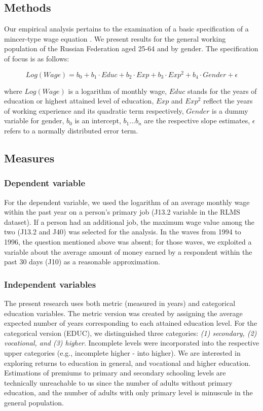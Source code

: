 \documentclass[12pt,a4paper]{article}
\numberwithin{equation}{section}
\begin{document}
\subsection*{Methods}

Our empirical analysis pertains to the examination of a basic specification of a mincer-type wage equation \parencite{mincer_082._1974}. We present results for the general working population of the Russian Federation aged 25-64 and by gender. The specification of focus is as follows:

$$Log(Wage) = b_0 + b_1\cdot Educ + b_2\cdot Exp + b_3\cdot Exp^2 + b_4\cdot Gender + \epsilon$$

\noindent
where $Log(Wage)$ is a logarithm of monthly wage, $Educ$ stands for the years of education or highest attained level of education, $Exp$ and $Exp^2$ reflect the years of working experience and its quadratic term respectively, $Gender$ is a dummy variable for gender, $b_0$ is an intercept, $b_1 ... b_n$ are the respective slope estimates, $\epsilon$ refers to a normally distributed error term.
\\

\subsection*{Measures}

\subsubsection*{Dependent variable}

For the dependent variable, we used the logarithm of an average monthly wage within the past year on a person's primary job (J13.2 variable in the RLMS dataset). If a person had an additional job, the maximum wage value among the two (J13.2 and J40) was selected for the analysis. In the waves from 1994 to 1996, the question mentioned above was absent; for those waves, we exploited a variable about the average amount of money earned by a respondent within the past 30 days (J10) as a reasonable approximation.
\\

\subsubsection*{Independent variables}

The present research uses both metric (measured in years) and categorical education variables. The metric version was created by assigning the average expected number of years corresponding to each attained education level. For the categorical version (EDUC), we distinguished three categories: \textit{(1) secondary, (2) vocational, and (3) higher}. Incomplete levels were incorporated into the respective upper categories (e.g., incomplete higher - into higher). We are interested in exploring returns to education in general, and vocational and higher education. Estimations of premiums to primary and secondary schooling levels are technically unreachable to us since the number of adults without primary education, and the number of adults with only primary level is minuscule in the general population. 
\end{document}
